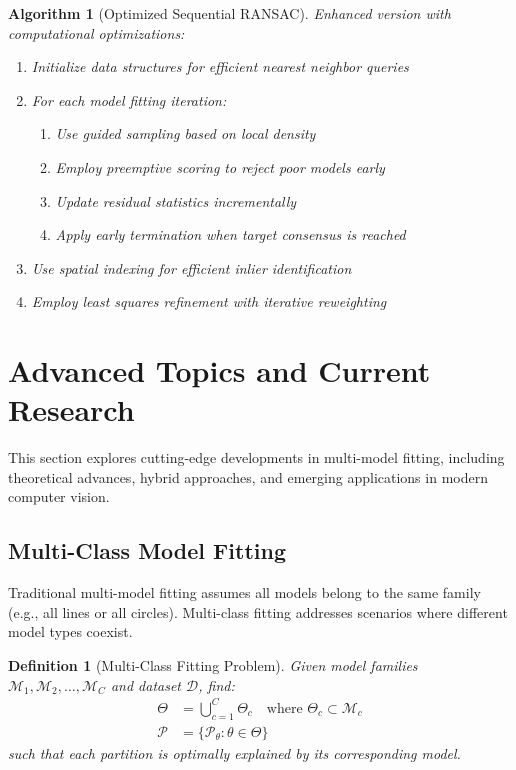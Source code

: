 \documentclass[12pt]{article}
\newtheorem{definition}[theorem]{Definition}
\newtheorem{algorithm}[theorem]{Algorithm}
\begin{document}
\begin{algorithm}[Optimized Sequential RANSAC]
    \label{alg:optimized_sequential_ransac}
    Enhanced version with computational optimizations:
    \begin{enumerate}
        \item Initialize data structures for efficient nearest neighbor queries
        \item For each model fitting iteration:
              \begin{enumerate}
                  \item Use guided sampling based on local density
                  \item Employ preemptive scoring to reject poor models early
                  \item Update residual statistics incrementally
                  \item Apply early termination when target consensus is reached
              \end{enumerate}
        \item Use spatial indexing for efficient inlier identification
        \item Employ least squares refinement with iterative reweighting
    \end{enumerate}
\end{algorithm}

\newpage

\section{Advanced Topics and Current Research}
\label{sec:advanced_topics}

This section explores cutting-edge developments in multi-model fitting, including theoretical advances, hybrid approaches, and emerging applications in modern computer vision.

\subsection{Multi-Class Model Fitting}
\label{subsec:multiclass_fitting}

Traditional multi-model fitting assumes all models belong to the same family (e.g., all lines or all circles). Multi-class fitting addresses scenarios where different model types coexist.

\begin{definition}[Multi-Class Fitting Problem]
    \label{def:multiclass_problem}
    Given model families $\mathcal{M}_1, \mathcal{M}_2, \ldots, \mathcal{M}_C$ and dataset $\mathcal{D}$, find:
    \begin{align}
        \Theta      & = \bigcup_{c=1}^C \Theta_c \quad \text{where } \Theta_c \subset \mathcal{M}_c \label{eq:multiclass_models} \\
        \mathcal{P} & = \{\mathcal{P}_{\theta} : \theta \in \Theta\} \label{eq:multiclass_partitions}
    \end{align}
    such that each partition is optimally explained by its corresponding model.
\end{definition}
\end{document}
